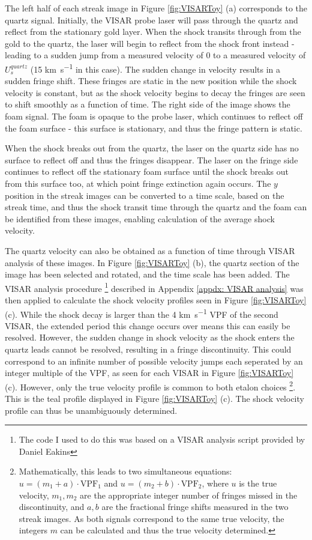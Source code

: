 The left half of each streak image in Figure \ref{fig:VISARToy} (a) corresponds to the quartz signal. Initially, the VISAR probe laser will pass through the quartz and reflect from the stationary gold layer. When the shock transits through from the gold to the quartz, the laser will begin to reflect from the shock front instead - leading to a sudden jump from a measured velocity of 0 to a measured velocity of $U_{s}^{quartz}$ (15 \unit{\kilo\meter\per\second} in this case). The sudden change in velocity results in a sudden fringe shift. These fringes are static in the new position while the shock velocity is constant, but as the shock velocity begins to decay the fringes are seen to shift smoothly as a function of time. The right side of the image shows the foam signal. The foam is opaque to the probe laser, which continues to reflect off the foam surface - this surface is stationary, and thus the fringe pattern is static.

When the shock breaks out from the quartz, the laser on the quartz side has no surface to reflect off and thus the fringes disappear. The laser on the fringe side continues to reflect off the stationary foam surface until the shock breaks out from this surface too, at which point fringe extinction again occurs. The $y$ position in the streak images can be converted to a time scale, based on the streak time, and thus the shock transit time through the quartz and the foam can be identified from these images, enabling calculation of the average shock velocity.

The quartz velocity can also be obtained as a function of time through VISAR analysis of these images. In Figure \ref{fig:VISARToy} (b), the quartz section of the image has been selected and rotated, and the time scale has been added. The VISAR analysis procedure \footnote{The code I used to do this was based on a VISAR analysis script provided by Daniel Eakins} described in Appendix \ref{appdx: VISAR analysis} was then applied to calculate the shock velocity profiles seen in Figure \ref{fig:VISARToy} (c). While the shock decay is larger than the 4 \unit{\kilo\meter\per\second} VPF of the second VISAR, the extended period this change occurs over means this can easily be resolved. However, the sudden change in shock velocity as the shock enters the quartz leads cannot be resolved, resulting in a fringe discontinuity. This could correspond to an infinite number of possible velocity jumps each seperated by an integer multiple of the VPF, as seen for each VISAR in Figure \ref{fig:VISARToy} (c). However, only the true velocity profile is common to both etalon choices \footnote{Mathematically, this leads to two simultaneous equations: $u = (m_1 + a) \cdot \textrm{VPF}_1$ and $u = (m_2 + b) \cdot \textrm{VPF}_2$, where $u$ is the true velocity, $m_1, m_2$ are the appropriate integer number of fringes missed in the discontinuity, and $a,b$ are the fractional fringe shifts measured in the two streak images. As both signals correspond to the same true velocity, the integers $m$ can be calculated and thus the true velocity determined.}. This is the teal profile displayed in Figure \ref{fig:VISARToy} (c). The shock velocity profile can thus be unambiguously determined.




